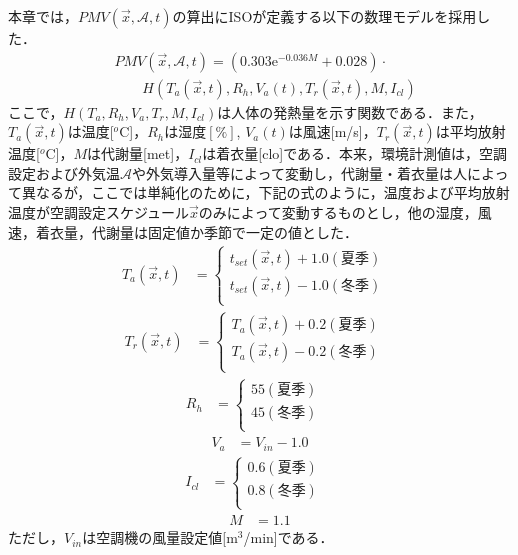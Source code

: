 本章では，$PMV(\vec{x},\mathcal{A},t)$の算出にISOが定義する以下の数理モデルを採用した．
\begin{align}
   & PMV(\vec{x},\mathcal{A},t) = (0.303\mathrm{e}^{-0.036M}+0.028)\cdot \nonumber \\
   & ~~~~~~~~~ H(T_a(\vec{x},t), R_h, V_a(t), T_r(\vec{x},t), M, I_{cl})
  \label{eq::math_pmv}
\end{align}
ここで，$H(T_a, R_h, V_a, T_r, M, I_{cl})$は人体の発熱量を示す関数である．また，$T_a(\vec{x},t)$は温度[$^o$C]，$R_h$は湿度$[\%]$, $V_a(t)$は風速[m/s]，$T_r(\vec{x},t)$は平均放射温度[$^o$C]，$M$は代謝量[met]，$I_{cl}$は着衣量[clo]である．本来，環境計測値は，空調設定および外気温$\mathcal{A}$や外気導入量等によって変動し，代謝量・着衣量は人によって異なるが，ここでは単純化のために，下記の式のように，温度および平均放射温度が空調設定スケジュール$\vec{x}$のみによって変動するものとし，他の湿度，風速，着衣量，代謝量は固定値か季節で一定の値とした．
\begin{align}
  T_a(\vec{x},t) & =
  \begin{cases}
    t_{set}(\vec{x},t) + 1.0 (夏季) & \\
    t_{set}(\vec{x},t) - 1.0 (冬季) & \\
  \end{cases}
  \label{eq::math_temperature}
\end{align}
\begin{align}
  T_r(\vec{x},t) & =
  \begin{cases}
    T_a(\vec{x}, t) + 0.2 (夏季) & \\
    T_a(\vec{x}, t) - 0.2 (冬季) & \\
  \end{cases}
  \label{eq::math_radiation}
\end{align}
\begin{align}
  R_h & =
  \begin{cases}
    55 (夏季) & \\
    45 (冬季) & \\
  \end{cases}
  \label{eq::math_humidity}
\end{align}
\begin{align}
  V_a & =V_{in}-1.0
  \label{eq::math_airvolume}
\end{align}
\begin{align}
  I_{cl} & =
  \begin{cases}
    0.6 (夏季) & \\
    0.8 (冬季) & \\
  \end{cases}
  \label{eq::math_cloth}
\end{align}
\begin{align}
  M & =1.1
  \label{eq::math_metabolic}
\end{align}
ただし，$V_{in}$は空調機の風量設定値[m$^3$/min]である．

